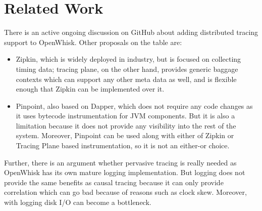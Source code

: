 \chapter{Related Work}

There is an active ongoing discussion on GitHub\cite{web:ghissue} about adding distributed tracing support to OpenWhisk. Other proposals on the table are:
\begin{itemize}
  \item Zipkin\cite{web:zipkin}, which is widely deployed in industry\cite{mace2017survey}, but is focused on collecting timing data; tracing plane, on the other hand, provides generic baggage contexts which can support any other meta data as well, and is flexible enough that Zipkin can be implemented over it.
  \item Pinpoint\cite{web:pinpoint}, also based on Dapper, which does not require any code changes as it uses bytecode instrumentation for JVM components. But it is also a limitation because it does not provide any visibility into the rest of the system. Moreover, Pinpoint can be used along with either of Zipkin or Tracing Plane based instrumentation, so it is not an either-or choice.
\end{itemize}

Further, there is an argument whether pervasive tracing is really needed as OpenWhisk has its own mature logging implementation. But logging does not provide the same benefits as causal tracing because it can only provide correlation which can go bad because of reasons such as clock skew. Moreover, with logging disk I/O can become a bottleneck.
